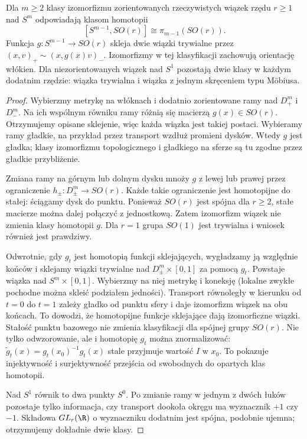 \begin{twierdzenie}
\label{thm:clutching-16}
Dla $m\geq2$ klasy izomorfizmu zorientowanych
rzeczywistych wiązek
rzędu $r\geq1$ nad $S^m$
odpowiadają klasom homotopii
\[
 [S^{m-1},SO(r)]
 \cong\pi_{m-1}(SO(r)).
\]
Funkcja $g:S^{m-1}\to SO(r)$
skleja dwie wiązki
trywialne przez
$(x,v)_+\sim(x,g(x)v)_-$.
Izomorfizmy w tej klasyfikacji zachowują orientację włókien.
Dla niezorientowanych
wiązek nad $S^1$ pozostają
dwie klasy w każdym dodatnim
rzędzie: wiązka trywialna
i wiązka z jednym skręceniem
typu Möbiusa.
\end{twierdzenie}
\begin{proof}
Wybierzmy metrykę na włóknach
i dodatnio zorientowane ramy
nad $D^m_+$ i $D^m_-$.
Na ich wspólnym równiku
ramy różnią się macierzą
$g(x)\in SO(r)$. Otrzymujemy
opisane sklejenie, więc
każda wiązka jest takiej
postaci. Wybieramy ramy gładkie, na przykład przez transport
wzdłuż promieni dysków. Wtedy $g$ jest gładka;
klasy izomorfizmu
topologicznego i gładkiego
na sferze są tu zgodne
przez gładkie przybliżenie.

Zmiana ramy na górnym
lub dolnym dysku mnoży
$g$ z lewej lub prawej
przez ograniczenie
$h_\pm:D^m_\pm\to SO(r)$.
Każde takie ograniczenie
jest homotopijne do stałej:
ściągamy dysk do punktu.
Ponieważ $SO(r)$ jest
spójna dla $r\geq2$,
stałe macierze można
dalej połączyć z
jednostkową. Zatem
izomorfizm wiązek
nie zmienia klasy
homotopii $g$.
Dla $r=1$ grupa $SO(1)$
jest trywialna i wniosek
również jest prawdziwy.

Odwrotnie, gdy $g_t$ jest homotopią funkcji
sklejających, wygładzamy ją względnie końców i sklejamy
wiązki trywialne nad
$D^m_\pm\times[0,1]$
za pomocą $g_t$.
Powstaje wiązka nad
$S^m\times[0,1]$.
Wybierzmy na niej
metrykę i koneksję
(lokalne zwykłe pochodne
można skleić podziałem
jedności). Transport
równoległy w kierunku
od $t=0$ do $t=1$
zależy gładko od punktu
sfery i daje izomorfizm
wiązek na obu końcach.
To dowodzi, że homotopijne
funkcje sklejające
dają izomorficzne wiązki.
Stałość punktu bazowego
nie zmienia klasyfikacji dla spójnej grupy $SO(r)$.
Nie tylko odwzorowanie, ale i homotopię $g_t$ można
znormalizować: $\widetilde g_t(x)=g_t(x_0)^{-1}g_t(x)$
stale przyjmuje wartość $I$ w $x_0$. To pokazuje
injektywność i surjektywność przejścia od swobodnych
do opartych klas homotopii.

Nad $S^1$ równik to
dwa punkty $S^0$.
Po zmianie ramy w
jednym z dwóch łuków
pozostaje tylko informacja,
czy transport dookoła
okręgu ma wyznacznik
$+1$ czy $-1$.
Składowa $GL_r(\R)$
o wyznaczniku dodatnim
jest spójna, podobnie
ujemna; otrzymujemy
dokładnie dwie klasy.
\end{proof}

